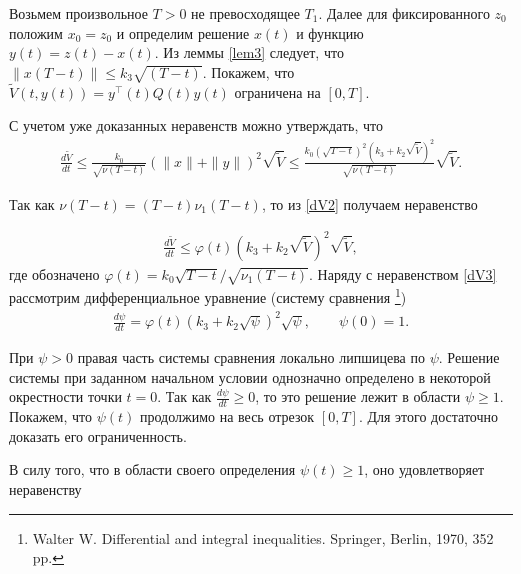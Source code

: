 \documentclass[../main.tex]{subfiles}
\begin{document}
	Возьмем произвольное $T>0$ не превосходящее $T_1$. Далее для фиксированного $z_0$ положим $x_0=z_0$ и определим решение $x(t)$ и функцию $y(t)=z(t)-x(t)$.  Из леммы \ref{lem3} следует, что  $\|x(T - t) \| \leqslant k_3\sqrt{(T - t)} $.  Покажем, что  $ \widetilde{V}(t,y(t))= y^{\top}(t) Q(t) y(t) $ ограничена на $[0, T]$.
	
	С учетом уже доказанных неравенств можно утверждать, что
	\begin{gather}\label{dV2}
		\frac{d\widetilde{V}}{dt} \leqslant \frac{k_0}{\sqrt{\nu(T - t)}} (\|x \| + \|y \|)^2 \sqrt{\widetilde{V}} \leqslant \frac{k_0 (\sqrt{T - t})^2 (k_3 + k_2 \sqrt{\widetilde{V}})^2 }{\sqrt{\nu(T - t)}} \sqrt{\widetilde{V}}.
	\end{gather}
	
	
	
	Так как $\nu (T - t) = (T - t) \nu_1 (T - t)$,
	то из \eqref{dV2} получаем неравенство
	
	\begin{gather}\label{dV3}
			\frac{d\widetilde{V}}{dt} \leqslant \varphi(t) \left(k_3 + k_2\sqrt{\widetilde{V}}\right)^2 \sqrt{\widetilde{V}},
	\end{gather}
	где  обозначено $\varphi (t) = k_0 \sqrt{T - t} / \sqrt{\nu_1 (T - t)}.$
	Наряду с неравенством \eqref{dV3} рассмотрим  дифференциальное уравнение (систему сравнения \footnote{Walter W. Differential and integral inequalities. Springer, Berlin, 1970, 352 pp.})
	\begin{gather*}
			\frac{d\psi}{dt} = \varphi (t) \left(k_3 + k_2\sqrt{\psi}\right)^2 \sqrt{\psi}, \qquad \psi (0) = 1.
	\end{gather*}
	
	При $\psi>0$ правая часть системы сравнения локально липшицева по $\psi$. Решение системы при заданном начальном условии однозначно определено  в некоторой окрестности точки $t=0$.  
	 Так как $\frac{d\psi}{dt} \geqslant 0$, то это решение лежит в области $\psi\geqslant1$. Покажем, что $\psi(t)$ продолжимо на весь отрезок $[0,T]$. Для этого достаточно доказать его ограниченность.   
	 
	 В силу того, что   в области своего определения $\psi(t)\geqslant1$, оно удовлетворяет неравенству 
	
\end{document}
